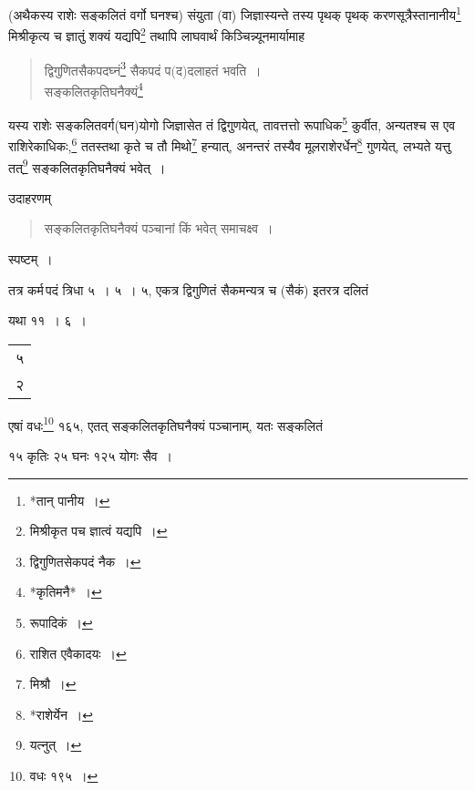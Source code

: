 \documentclass[10pt, openany]{book}
\begin{document}
{{{{{{{{{{{{{{{(अथैकस्य राशेः सङ्कलितं वर्गो घनश्च) संयुता (वा) जिज्ञास्यन्ते तस्य
पृथक् पृथक्}
{करणसूत्रैस्तानानीय\renewcommand{\thefootnote}{५}\footnote{*तान् पानीय~।} मिश्रीकृत्य च ज्ञातुं शक्यं यद्यपि\renewcommand{\thefootnote}{६}\footnote{मिश्रीकृत पच ज्ञात्वं यद्यपि~।} तथापि लाघवार्थं किञ्चिन्न्यूनमार्यामाह\textemdash}

 \label{102.1}
\begin{quote}
 {\bs द्विगुणितसैकपदघ्नं\renewcommand{\thefootnote}{७}\footnote{द्विगुणितसेकपदं नैक~।} सैकपदं प(द)दलाहतं भवति~। \\
 सङ्कलितकृतिघनैक्यं\renewcommand{\thefootnote}{८}\footnote{*कृतिमनै*~।}}
\end{quote}

{यस्य राशेः सङ्कलितवर्ग(घन)योगो जिज्ञासेत तं द्विगुणयेत्,
 तावत्तत्तो रूपाधिक\renewcommand{\thefootnote}{९}\footnote{रूपादिकं~।}}
{कुर्वीत, अन्यतश्च स एव राशिरेकाधिकः,\renewcommand{\thefootnote}{१०}\footnote{राशित एवैकादयः~।} ततस्तथा कृते च तौ मिथो\renewcommand{\thefootnote}{११}\footnote{मिश्रौ~।}
हन्यात्, अनन्तरं}
{तस्यैव मूलराशेरर्धेन\renewcommand{\thefootnote}{१२}\footnote{*राशेर्येन~।} गुणयेत्, लभ्यते यत्तु तत्\renewcommand{\thefootnote}{१३}\footnote{यत्नुत्~।}
सङ्कलितकृतिघनैक्यं भवेत्~।}
\vspace{3mm}

{उदाहरणम्\textemdash}

\begin{quote}
    
{\eg सङ्कलितकृतिघनैक्यं पञ्चानां किं भवेत् समाचक्ष्व~।}\end{quote}

\newpage

{स्पष्टम्~।}
\vspace{3mm}

{तत्र कर्म\textendash \,पदं त्रिधा ५~। ५~। ५, एकत्र द्विगुणितं सैकमन्यत्र च (सैकं)
इतरत्र दलितं}
{यथा ११~। ६~। \begin{tabular}{c}५\\२\end{tabular} एषां वधः\renewcommand{\thefootnote}{१}\footnote{वधः १९५~।}  १६५, एतत् सङ्कलितकृतिघनैक्यं
पञ्चानाम्, यतः सङ्कलितं}
{१५ कृतिः २५ घनः १२५ योगः सैव~।}
\vspace{3mm}

}}}}}}}}}}}}}}
\end{document}
